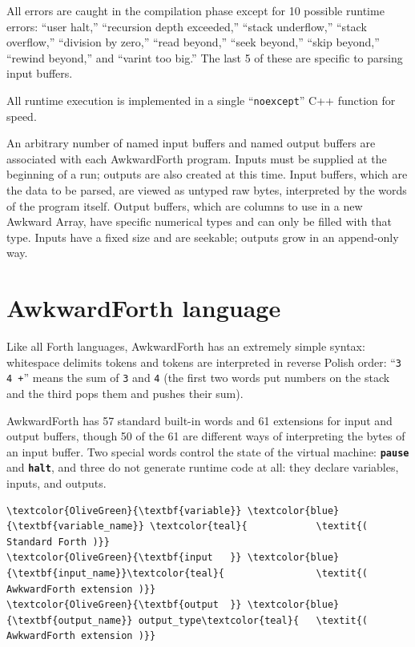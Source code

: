 \documentclass{webofc}
\begin{document}
All errors are caught in the compilation phase except for 10 possible runtime errors: ``user halt,'' ``recursion depth exceeded,'' ``stack underflow,'' ``stack overflow,'' ``division by zero,'' ``read beyond,'' ``seek beyond,'' ``skip beyond,'' ``rewind beyond,'' and ``varint too big.'' The last 5 of these are specific to parsing input buffers.

All runtime execution is implemented in a single ``\texttt{noexcept}'' C++ function for speed.

An arbitrary number of named input buffers and named output buffers are associated with each AwkwardForth program. Inputs must be supplied at the beginning of a run; outputs are also created at this time. Input buffers, which are the data to be parsed, are viewed as untyped raw bytes, interpreted by the words of the program itself. Output buffers, which are columns to use in a new Awkward Array, have specific numerical types and can only be filled with that type. Inputs have a fixed size and are seekable; outputs grow in an append-only way.

\section{AwkwardForth language}

Like all Forth languages, AwkwardForth has an extremely simple syntax: whitespace delimits tokens and tokens are interpreted in reverse Polish order: ``\texttt{3 4 +}'' means the sum of \texttt{3} and \texttt{4} (the first two words put numbers on the stack and the third pops them and pushes their sum).

AwkwardForth has 57 standard built-in words and 61 extensions for input and output buffers, though 50 of the 61 are different ways of interpreting the bytes of an input buffer. Two special words control the state of the virtual machine: \textcolor{OliveGreen}{\tt\textbf{pause}} and \textcolor{OliveGreen}{\tt\textbf{halt}}, and three do not generate runtime code at all: they declare variables, inputs, and outputs.

\begin{Verbatim}[commandchars=\\\{\}]
\textcolor{OliveGreen}{\textbf{variable}} \textcolor{blue}{\textbf{variable_name}} \textcolor{teal}{            \textit{( Standard Forth )}}
\textcolor{OliveGreen}{\textbf{input   }} \textcolor{blue}{\textbf{input_name}}\textcolor{teal}{                \textit{( AwkwardForth extension )}}
\textcolor{OliveGreen}{\textbf{output  }} \textcolor{blue}{\textbf{output_name}} output_type\textcolor{teal}{   \textit{( AwkwardForth extension )}}
\end{Verbatim}
\end{document}
